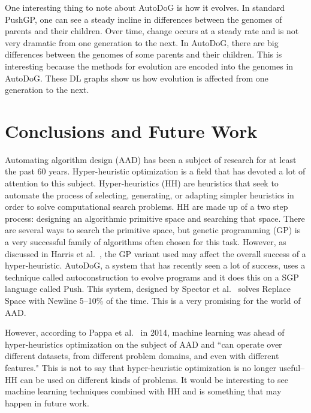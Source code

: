 \documentclass{sig-alternate}
\begin{document}

One interesting thing to note about AutoDoG is how it evolves. In standard PushGP, one can see a steady incline in differences between the genomes of parents and their children. Over time, change occurs at a steady rate and is not very dramatic from one generation to the next. In AutoDoG, there are big differences between the genomes of some parents and their children. This is interesting because the methods for evolution are encoded into the genomes in AutoDoG. These DL graphs  show us how evolution is affected from one generation to the next.
\section{Conclusions and Future Work}
\label{sec:conclusion}
Automating algorithm design (AAD) has been a subject of research for at least the past 60 years. Hyper-heuristic optimization is a field that has devoted a lot of attention to this subject. Hyper-heuristics (HH) are heuristics that seek to automate the process of selecting, generating, or adapting simpler heuristics in order to solve computational search problems. HH are made up of a two step process: designing an algorithmic primitive space and searching that space. There are several ways to search the primitive space, but genetic programming (GP) is a very successful family of algorithms often chosen for this task. However, as discussed in Harris et al.~\cite{harris:2015}, the GP variant used may affect the overall success of a hyper-heuristic. AutoDoG, a system that has recently seen a lot of success, uses a technique called autoconstruction to evolve programs and it does this on a SGP language called Push. This system, designed by Spector et al.~\cite{spector:2016} solves Replace Space with Newline 5--10\% of the time. This is a very promising for the world of AAD.

However, according to Pappa et al.~\cite{pappa:2014} in 2014, machine learning was ahead of hyper-heuristics optimization on the subject of AAD and ``can operate over different datasets, from different problem domains, and even with different features." This is not to say that hyper-heuristic optimization is no longer useful--HH can be used on different kinds of problems. It would be interesting to see machine learning techniques combined with HH and is something that may happen in future work.
\end{document}
